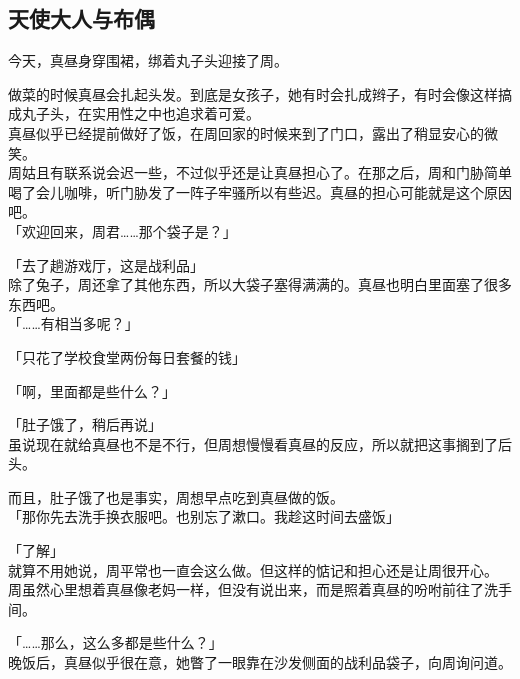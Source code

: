 \subsection{天使大人与布偶}

今天，真昼身穿围裙，绑着丸子头迎接了周。

做菜的时候真昼会扎起头发。到底是女孩子，她有时会扎成辫子，有时会像这样搞成丸子头，在实用性之中也追求着可爱。\\

真昼似乎已经提前做好了饭，在周回家的时候来到了门口，露出了稍显安心的微笑。\\

周姑且有联系说会迟一些，不过似乎还是让真昼担心了。在那之后，周和门胁简单喝了会儿咖啡，听门胁发了一阵子牢骚所以有些迟。真昼的担心可能就是这个原因吧。\\

「欢迎回来，周君……那个袋子是？」

「去了趟游戏厅，这是战利品」\\

除了兔子，周还拿了其他东西，所以大袋子塞得满满的。真昼也明白里面塞了很多东西吧。\\

「……有相当多呢？」

「只花了学校食堂两份每日套餐的钱」

「啊，里面都是些什么？」

「肚子饿了，稍后再说」\\

虽说现在就给真昼也不是不行，但周想慢慢看真昼的反应，所以就把这事搁到了后头。

而且，肚子饿了也是事实，周想早点吃到真昼做的饭。\\

「那你先去洗手换衣服吧。也别忘了漱口。我趁这时间去盛饭」

「了解」\\

就算不用她说，周平常也一直会这么做。但这样的惦记和担心还是让周很开心。\\

周虽然心里想着真昼像老妈一样，但没有说出来，而是照着真昼的吩咐前往了洗手间。\\

\vspace{2\baselineskip}

「……那么，这么多都是些什么？」\\

晚饭后，真昼似乎很在意，她瞥了一眼靠在沙发侧面的战利品袋子，向周询问道。\\

